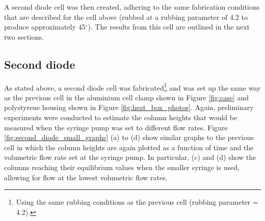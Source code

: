 A second diode cell was then created, adhering to the same fabrication conditions that are described for the cell above (rubbed at a rubbing parameter of 4.2 to produce approximately 45$^{\circ}$). The results from this cell are outlined in the next two sections.

\subsection{Second diode}
\label{sec:second_diode}
As stated above, a second diode cell was fabricated\footnote{Using the same rubbing conditions as the previous cell (rubbing parameter = 4.2).} and was set up the same way as the previous cell in the aluminium cell clamp shown in Figure \ref{fig:case} and polystyrene housing shown in Figure \ref{fig:heat_box_photos}. Again, preliminary experiments were conducted to estimate the column heights that would be measured when the syringe pump was set to different flow rates. Figure \ref{fig:second_diode_small_graphs} (a) to (d) show similar graphs to the previous cell in which the column heights are again plotted as a function of time and the volumetric flow rate set at the syringe pump. In particular, (c) and (d) show the columns reaching their equilibrium values when the smaller syringe is used, allowing for flow at the lowest volumetric flow rates.

